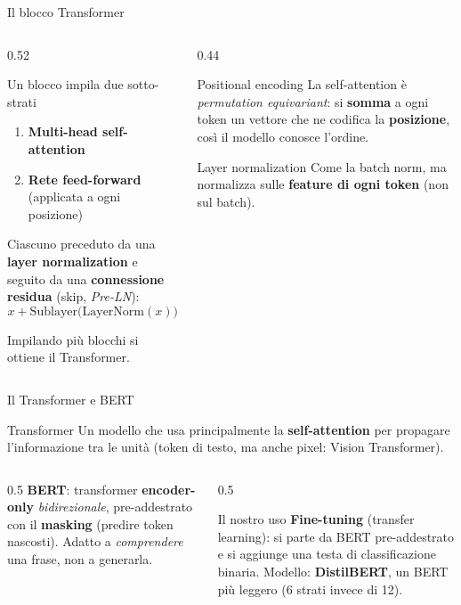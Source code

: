 \documentclass[aspectratio=169]{beamer}
\begin{document}
\begin{frame}{Il blocco Transformer}
  \begin{columns}[T]
    \begin{column}{0.52\textwidth}
      \begin{block}{Un blocco impila due sotto-strati}
        \begin{enumerate}
          \item \textbf{Multi-head self-attention}
          \item \textbf{Rete feed-forward} (applicata a ogni posizione)
        \end{enumerate}
        Ciascuno preceduto da una \textbf{layer normalization} e seguito da una
        \textbf{connessione residua} (skip, \emph{Pre-LN}):
        \[ x + \mathrm{Sublayer}\big(\mathrm{LayerNorm}(x)\big) \]
      \end{block}
      Impilando più blocchi si ottiene il Transformer.
    \end{column}
    \begin{column}{0.44\textwidth}
      \begin{block}{Positional encoding}
        La self-attention è \emph{permutation equivariant}: si \textbf{somma} a
        ogni token un vettore che ne codifica la \textbf{posizione}, così il
        modello conosce l'ordine.
      \end{block}
      \begin{block}{Layer normalization}
        Come la batch norm, ma normalizza sulle \textbf{feature di ogni token}
        (non sul batch).
      \end{block}
    \end{column}
  \end{columns}
\end{frame}

\begin{frame}{Il Transformer e BERT}
  \begin{block}{Transformer}
    Un modello che usa principalmente la \textbf{self-attention} per propagare
    l'informazione tra le unità (token di testo, ma anche pixel: Vision
    Transformer).
  \end{block}
  \begin{columns}[T]
    \begin{column}{0.5\textwidth}
      \textbf{BERT}: transformer \textbf{encoder-only} \emph{bidirezionale},
      pre-addestrato con il \textbf{masking} (predire token nascosti).
      Adatto a \emph{comprendere} una frase, non a generarla.
    \end{column}
    \begin{column}{0.5\textwidth}
      \begin{block}{Il nostro uso}
        \textbf{Fine-tuning} (transfer learning): si parte da BERT
        pre-addestrato e si aggiunge una testa di classificazione binaria.
        Modello: \textbf{DistilBERT}, un BERT più leggero (6 strati invece di 12).
      \end{block}
    \end{column}
  \end{columns}
\end{frame}
\end{document}
